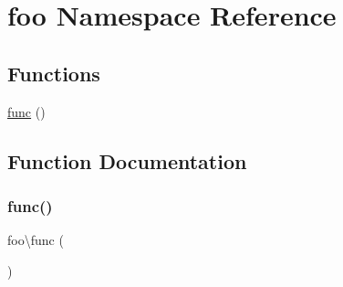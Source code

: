 \hypertarget{namespacefoo}{}\section{foo Namespace Reference}
\label{namespacefoo}
\subsection*{Functions}
\begin{DoxyCompactItemize}
\item 
\mbox{\hyperlink{namespacefoo_ad6d2ba6f0c3fb27a84b6ff10e945e96d}{func}} ()
\end{DoxyCompactItemize}


\subsection{Function Documentation}
\mbox{\label{namespacefoo_ad6d2ba6f0c3fb27a84b6ff10e945e96d}} 
\subsubsection{\texorpdfstring{func()}{func()}}
{\footnotesize\ttfamily foo\textbackslash{}func (\begin{DoxyParamCaption}{ }\end{DoxyParamCaption})}

